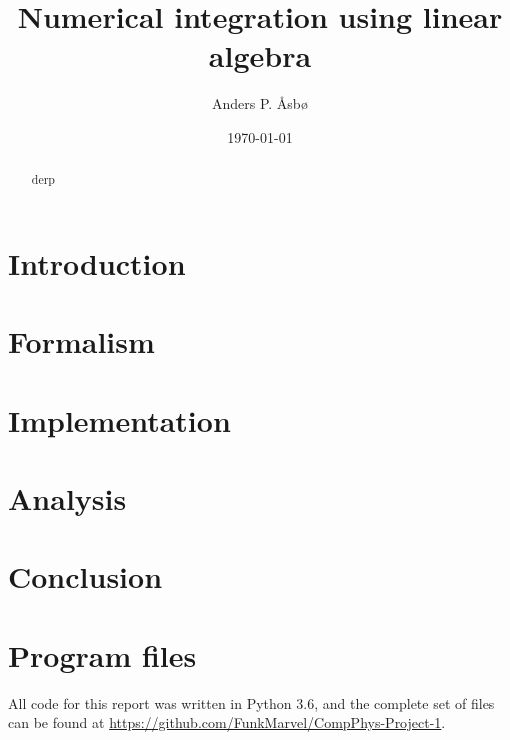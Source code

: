 \documentclass[english,notitlepage]{revtex4-1}  %
\begin{document}
\title{Numerical integration using linear algebra}   %
\author{Anders P. Åsbø}               %
\date{\today}
\noaffiliation                            %

\begin{abstract}
derp
\end{abstract}

\maketitle
\tableofcontents

\section{Introduction}\label{sec:1}

\section{Formalism}\label{sec:2}

\section{Implementation}\label{sec:3}

\section{Analysis}\label{sec:4}

\section{Conclusion}\label{sec:5}

\appendix
\section{Program files} \label{A:1}
All code for this report was written in Python 3.6, and the complete set of files can be found at \url{https://github.com/FunkMarvel/CompPhys-Project-1}.
\end{document}
